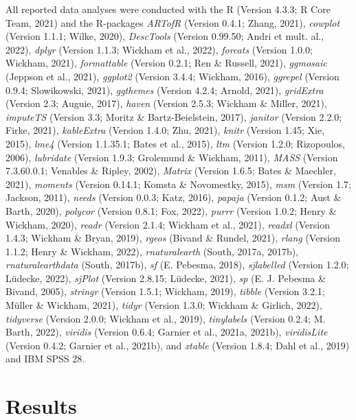 \documentclass[
  man]{apa6}
\begin{document}
All reported data analyses were conducted with the R (Version 4.3.3; R Core Team, 2021) and the R-packages \emph{ARTofR} (Version 0.4.1; Zhang, 2021), \emph{cowplot} (Version 1.1.1; Wilke, 2020), \emph{DescTools} (Version 0.99.50; Andri et mult. al., 2022), \emph{dplyr} (Version 1.1.3; Wickham et al., 2022), \emph{forcats} (Version 1.0.0; Wickham, 2021), \emph{formattable} (Version 0.2.1; Ren \& Russell, 2021), \emph{ggmosaic} (Jeppson et al., 2021), \emph{ggplot2} (Version 3.4.4; Wickham, 2016), \emph{ggrepel} (Version 0.9.4; Slowikowski, 2021), \emph{ggthemes} (Version 4.2.4; Arnold, 2021), \emph{gridExtra} (Version 2.3; Auguie, 2017), \emph{haven} (Version 2.5.3; Wickham \& Miller, 2021), \emph{imputeTS} (Version 3.3; Moritz \& Bartz-Beielstein, 2017), \emph{janitor} (Version 2.2.0; Firke, 2021), \emph{kableExtra} (Version 1.4.0; Zhu, 2021), \emph{knitr} (Version 1.45; Xie, 2015), \emph{lme4} (Version 1.1.35.1; Bates et al., 2015), \emph{ltm} (Version 1.2.0; Rizopoulos, 2006), \emph{lubridate} (Version 1.9.3; Grolemund \& Wickham, 2011), \emph{MASS} (Version 7.3.60.0.1; Venables \& Ripley, 2002), \emph{Matrix} (Version 1.6.5; Bates \& Maechler, 2021), \emph{moments} (Version 0.14.1; Komsta \& Novomestky, 2015), \emph{msm} (Version 1.7; Jackson, 2011), \emph{needs} (Version 0.0.3; Katz, 2016), \emph{papaja} (Version 0.1.2; Aust \& Barth, 2020), \emph{polycor} (Version 0.8.1; Fox, 2022), \emph{purrr} (Version 1.0.2; Henry \& Wickham, 2020), \emph{readr} (Version 2.1.4; Wickham et al., 2021), \emph{readxl} (Version 1.4.3; Wickham \& Bryan, 2019), \emph{rgeos} (Bivand \& Rundel, 2021), \emph{rlang} (Version 1.1.2; Henry \& Wickham, 2022), \emph{rnaturalearth} (South, 2017a, 2017b), \emph{rnaturalearthdata} (South, 2017b), \emph{sf} (E. Pebesma, 2018), \emph{sjlabelled} (Version 1.2.0; Lüdecke, 2022), \emph{sjPlot} (Version 2.8.15; Lüdecke, 2021), \emph{sp} (E. J. Pebesma \& Bivand, 2005), \emph{stringr} (Version 1.5.1; Wickham, 2019), \emph{tibble} (Version 3.2.1; Müller \& Wickham, 2021), \emph{tidyr} (Version 1.3.0; Wickham \& Girlich, 2022), \emph{tidyverse} (Version 2.0.0; Wickham et al., 2019), \emph{tinylabels} (Version 0.2.4; M. Barth, 2022), \emph{viridis} (Version 0.6.4; Garnier et al., 2021a, 2021b), \emph{viridisLite} (Version 0.4.2; Garnier et al., 2021b), and \emph{xtable} (Version 1.8.4; Dahl et al., 2019) and IBM SPSS 28.

\section{Results}\label{results}
\end{document}
